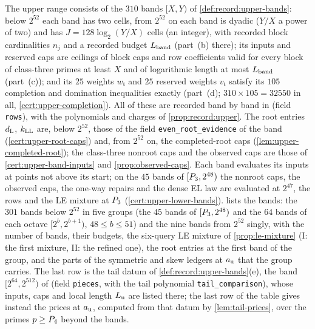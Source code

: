 The upper range consists of the $310$ bands $[X,Y)$ of
\cref{def:record:upper-bands}: below $2^{52}$ each band has two cells, from
$2^{52}$ on each band is dyadic ($Y/X$ a power of two) and has
$J=128\log_2(Y/X)$ cells (an integer), with recorded block
cardinalities $n_j$ and
a recorded budget $L_{\rm band}$ (part~(b) there); its inputs and reserved caps
are ceilings of block caps and row coefficients valid for every block of
class-three primes at least $X$ and of logarithmic length at most $L_{\rm band}$
(part~(c)); and its $25$ weights $w_{\mathfrak t}$ and $25$ reserved weights
$v_{\mathfrak t}$ satisfy its $105$ completion and domination inequalities
exactly (part~(d); $310\times105=32550$ in all, \cref{cert:upper-completion}).
All of these are recorded band by band in
 (field
\texttt{rows}), with the polynomials and charges of \cref{prop:record:upper}. The
root entries $d_{\rm L}$, $k_{\rm LL}$ are, below $2^{52}$, those of the field
\texttt{even\_root\_evidence} of the band (\cref{cert:upper-root-caps}) and, from
$2^{52}$ on, the completed-root caps (\cref{lem:upper-completed-root}); the
class-three nonroot caps and the observed caps are those of
\cref{cert:upper-band-inputs} and \cref{prop:observed-caps}. Each band evaluates
its inputs at points not above its start; on the $45$ bands of $[P_3,2^{48})$
the nonroot caps, the observed caps, the one-way repairs and the dense EL law are
evaluated at $2^{47}$, the rows and the LE mixture at $P_3$
(\cref{cert:upper-lower-bands}).  lists the bands: the
$301$ bands below $2^{52}$ in five groups (the $45$ bands of $[P_3,2^{48})$ and
the $64$ bands of each octave $[2^b,2^{b+1})$, $48\le b\le51$) and the nine bands
from $2^{52}$ singly, with the number of bands, their budgets, the six-query LE
mixture of \cref{prop:le-mixture} (I: the first mixture, II: the refined one), the
root entries at the first band of the group, and the parts of the symmetric and
skew ledgers at $a_{\rm u}$ that the group carries. The last row is the tail datum
of \cref{def:record:upper-bands}(e), the band $[2^{64},2^{512})$ of
 (field
\texttt{pieces}, with the tail polynomial \texttt{tail\_comparison}), whose inputs,
caps and local length $L_{\rm u}$ are listed there; the last row of the table gives instead the prices at
$a_{\rm u}$, computed from that datum by \cref{lem:tail-prices},
over the primes $p\ge P_4$ beyond the bands.

